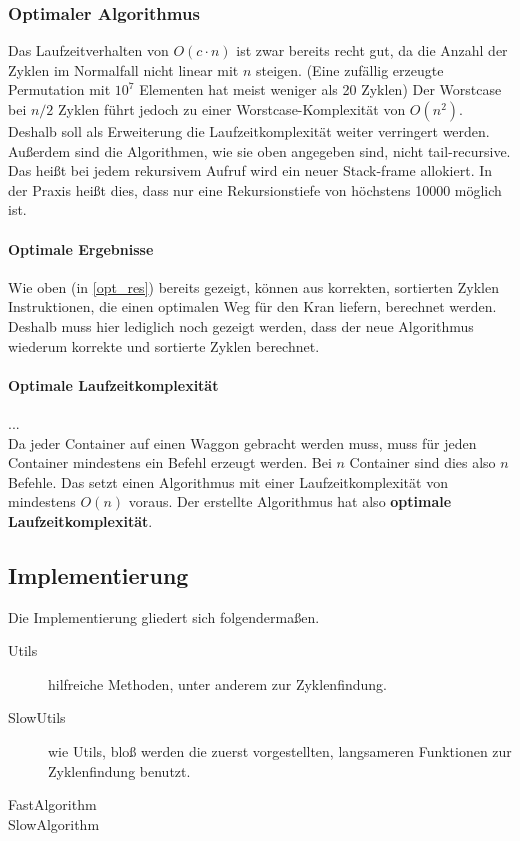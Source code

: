 \subsubsection{Optimaler Algorithmus} %
Das Laufzeitverhalten von $O(c \cdot n)$ ist zwar bereits recht gut, da die Anzahl der Zyklen im Normalfall nicht linear mit $n$ steigen.
(Eine zufällig erzeugte Permutation mit $10^7$ Elementen hat meist weniger als 20 Zyklen)%
Der Worstcase bei $n/2$ Zyklen führt jedoch zu einer Worstcase-Komplexität von $O(n^2)$. \\
Deshalb soll als Erweiterung die Laufzeitkomplexität weiter verringert werden. \\
Außerdem sind die Algorithmen, wie sie oben angegeben sind, nicht tail-recursive.
Das heißt bei jedem rekursivem Aufruf wird ein neuer Stack-frame allokiert.
In der Praxis heißt dies, dass nur eine Rekursionstiefe von höchstens 10000 möglich ist.

\paragraph{Optimale Ergebnisse}
Wie oben (in \ref{opt_res}) bereits gezeigt, können aus korrekten, sortierten Zyklen Instruktionen, die einen optimalen Weg für den Kran liefern, berechnet werden.
Deshalb muss hier lediglich noch gezeigt werden, dass der neue Algorithmus wiederum korrekte und sortierte Zyklen berechnet. \\

\paragraph{Optimale Laufzeitkomplexität}
... \\
Da jeder Container auf einen Waggon gebracht werden muss, muss für jeden Container mindestens ein Befehl erzeugt werden.
Bei $n$ Container sind dies also $n$ Befehle. Das setzt einen Algorithmus mit einer Laufzeitkomplexität von mindestens $O(n)$ voraus.
Der erstellte Algorithmus hat also \textbf{optimale Laufzeitkomplexität}.

\subsection{Implementierung}
Die Implementierung gliedert sich folgendermaßen.
\begin{description}
 \item[Utils] hilfreiche Methoden, unter anderem zur Zyklenfindung.
 \item[SlowUtils] wie Utils, bloß werden die zuerst vorgestellten, langsameren Funktionen zur Zyklenfindung benutzt.
 \item[FastAlgorithm]
 \item[SlowAlgorithm]
\end{description}

